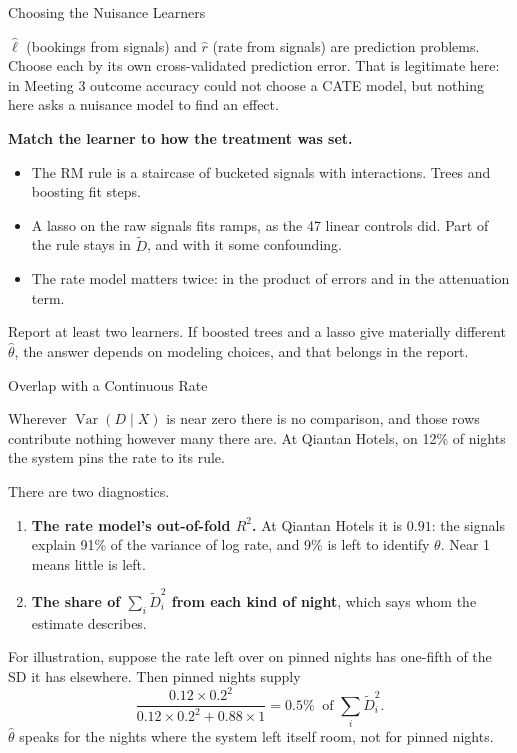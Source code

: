 \documentclass[aspectratio=169, 11pt, handout]{beamer}
\newcommand{\Var}{\operatorname{Var}}
\begin{document}
\begin{frame}{Choosing the Nuisance Learners}

$\hat\ell$ (bookings from signals) and $\hat r$ (rate from signals) are prediction problems. Choose each by its own cross-validated prediction error. That is legitimate here: in Meeting 3 outcome accuracy could not choose a CATE model, but nothing here asks a nuisance model to find an effect.

\bigskip

\textbf{Match the learner to how the treatment was set.}
\begin{itemize}
  \item The RM rule is a staircase of bucketed signals with interactions. Trees and boosting fit steps.
  \item A lasso on the raw signals fits ramps, as the 47 linear controls did. Part of the rule stays in $\tilde D$, and with it some confounding.
  \item The rate model matters twice: in the product of errors and in the attenuation term.
\end{itemize}

\bigskip

Report at least two learners. If boosted trees and a lasso give materially different $\hat\theta$, the answer depends on modeling choices, and that belongs in the report.
\end{frame}

\begin{frame}{Overlap with a Continuous Rate}

Wherever $\Var(D \mid X)$ is near zero there is no comparison, and those rows contribute nothing however many there are. At Qiantan Hotels, on 12\% of nights the system pins the rate to its rule.

\bigskip

There are two diagnostics.
\begin{enumerate}
  \item \textbf{The rate model's out-of-fold $R^2$.} At Qiantan Hotels it is $0.91$: the signals explain 91\% of the variance of log rate, and 9\% is left to identify $\theta$. Near 1 means little is left.
  \item \textbf{The share of $\sum_i \tilde D_i^2$ from each kind of night}, which says whom the estimate describes.
\end{enumerate}

\bigskip

For illustration, suppose the rate left over on pinned nights has one-fifth of the SD it has elsewhere. Then pinned nights supply
\[
\frac{0.12 \times 0.2^2}{0.12 \times 0.2^2 + 0.88 \times 1} = 0.5\% \ \text{ of } \textstyle\sum_i \tilde D_i^2 .
\]
$\hat\theta$ speaks for the nights where the system left itself room, not for pinned nights.
\end{frame}
\end{document}
